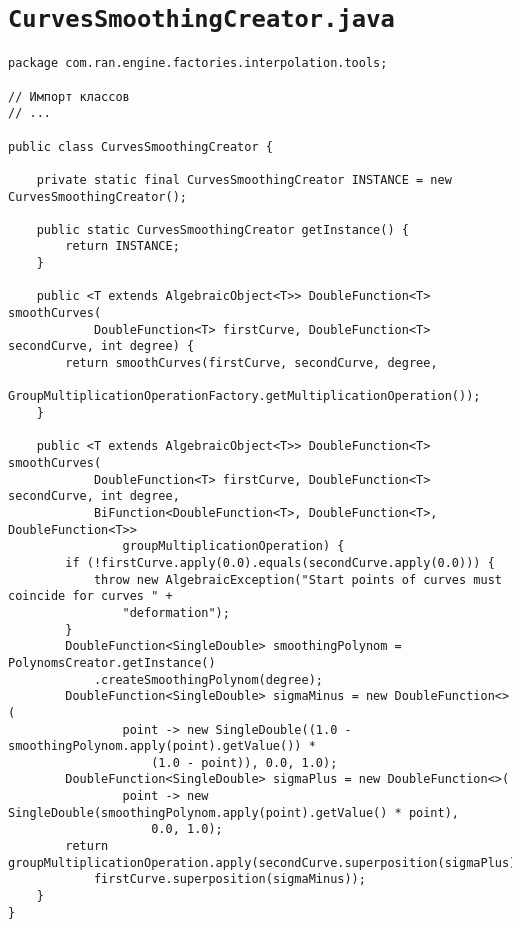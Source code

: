 \section*{\texttt{CurvesSmoothingCreator.java}}
\begin{verbatim}
package com.ran.engine.factories.interpolation.tools;

// Импорт классов
// ...

public class CurvesSmoothingCreator {

    private static final CurvesSmoothingCreator INSTANCE = new CurvesSmoothingCreator();

    public static CurvesSmoothingCreator getInstance() {
        return INSTANCE;
    }

    public <T extends AlgebraicObject<T>> DoubleFunction<T> smoothCurves(
            DoubleFunction<T> firstCurve, DoubleFunction<T> secondCurve, int degree) {
        return smoothCurves(firstCurve, secondCurve, degree,
                GroupMultiplicationOperationFactory.getMultiplicationOperation());
    }

    public <T extends AlgebraicObject<T>> DoubleFunction<T> smoothCurves(
            DoubleFunction<T> firstCurve, DoubleFunction<T> secondCurve, int degree,
            BiFunction<DoubleFunction<T>, DoubleFunction<T>, DoubleFunction<T>>
                groupMultiplicationOperation) {
        if (!firstCurve.apply(0.0).equals(secondCurve.apply(0.0))) {
            throw new AlgebraicException("Start points of curves must coincide for curves " +
                "deformation");
        }
        DoubleFunction<SingleDouble> smoothingPolynom = PolynomsCreator.getInstance()
            .createSmoothingPolynom(degree);
        DoubleFunction<SingleDouble> sigmaMinus = new DoubleFunction<>(
                point -> new SingleDouble((1.0 - smoothingPolynom.apply(point).getValue()) *
                    (1.0 - point)), 0.0, 1.0);
        DoubleFunction<SingleDouble> sigmaPlus = new DoubleFunction<>(
                point -> new SingleDouble(smoothingPolynom.apply(point).getValue() * point),
                    0.0, 1.0);
        return groupMultiplicationOperation.apply(secondCurve.superposition(sigmaPlus),
            firstCurve.superposition(sigmaMinus));
    }
}
\end{verbatim}

